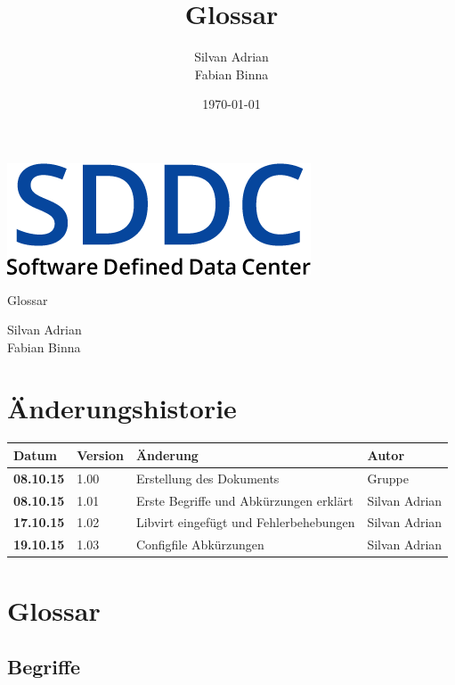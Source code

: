 \documentclass[11pt]{scrartcl}
\title{Glossar}
\author{Silvan Adrian \\ Fabian Binna}
\date{\today{}}
\begin{document}
\def\arraystretch{1.5}
\begin{titlepage}
\begin{center}
\vspace{10em}
\includegraphics[scale=2]{SDDC}
\vspace{10em}
\end{center}
\begin{center}
\huge {Glossar}
\end{center}
\begin{center}
\vspace{10em}
\LARGE {Silvan Adrian} \\
\LARGE {Fabian Binna}
\end{center}

\end{titlepage}

\newpage
\section{Änderungshistorie}
\begin{tabularx}{\linewidth}{l l X l}
\textbf{Datum} & \textbf{Version} & \textbf{Änderung}  & \textbf{Autor} \\
\hline
\textbf{08.10.15} & 1.00 & Erstellung des Dokuments & Gruppe \\
\textbf{08.10.15} & 1.01 & Erste Begriffe und Abkürzungen erklärt & Silvan Adrian\\
\textbf{17.10.15} & 1.02 & Libvirt eingefügt und Fehlerbehebungen & Silvan Adrian\\
\textbf{19.10.15} & 1.03 & Configfile Abkürzungen & Silvan Adrian\\
\end{tabularx}

\newpage
\tableofcontents
\newpage

\section{Glossar}
\subsection{Begriffe}
\end{document}

